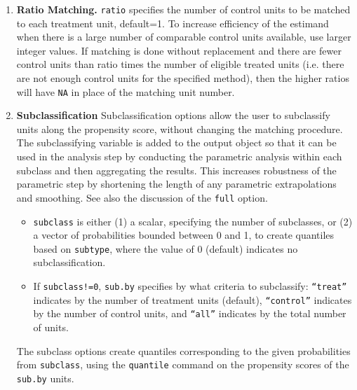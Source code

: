\documentclass[oneside,letterpaper,titlepage]{article}
\begin{document}
\begin{enumerate}
\item \textbf{Ratio Matching.}  \texttt{ratio} specifies the number of
  control units to be matched to each treatment unit, default=1.  To
  increase efficiency of the estimand when there is a large number of
  comparable control units available, use larger integer values. If
  matching is done without replacement and there are fewer control
  units than ratio times the number of eligible treated units (i.e.
  there are not enough control units for the specified method), then
  the higher ratios will have \texttt{NA} in place of the matching
  unit number.
  
\item \textbf{Subclassification} Subclassification options allow the
  user to subclassify units along the propensity score, without
  changing the matching procedure.  The subclassifying variable is
  added to the output object so that it can be used in the analysis
  step by conducting the parametric analysis within each subclass and
  then aggregating the results.  This increases robustness of the
  parametric step by shortening the length of any parametric
  extrapolations and smoothing.  See also the discussion of the \texttt{full} option.  
  \begin{itemize}
  \item \texttt{subclass} is either (1) a scalar, specifying the
    number of subclasses, or (2) a vector of probabilities bounded
    between 0 and 1, to create quantiles based on \texttt{subtype},
    where the value of 0 (default) indicates no subclassification.
  \item If \texttt{subclass!=0}, \texttt{sub.by} specifies by what
    criteria to subclassify: \texttt{``treat''} indicates by the
    number of treatment units (default), \texttt{``control''}
    indicates by the number of control units, and \texttt{``all''}
    indicates by the total number of units.
  \end{itemize}
  The subclass options create quantiles corresponding to the given
  probabilities from \texttt{subclass}, using the \texttt{quantile}
  command on the propensity scores of the \texttt{sub.by} units.
  

\end{enumerate}
\end{document}
